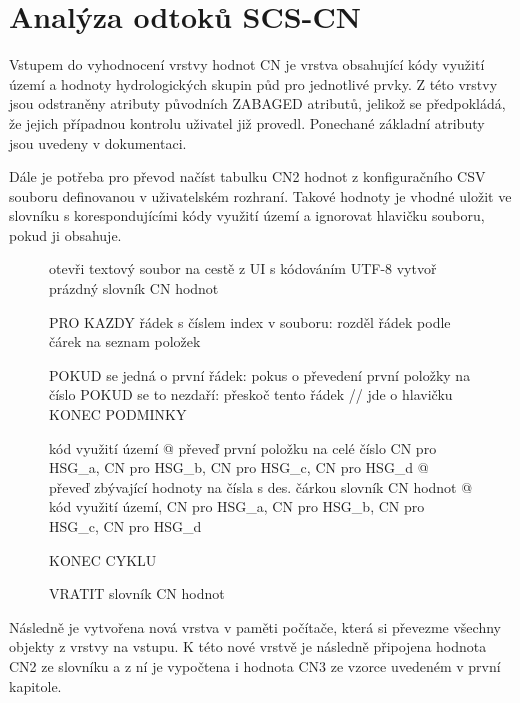 \documentclass[a4paper,oneside,12pt]{book}
\begin{document}
\section{Analýza odtoků SCS-CN} \label{CN}

\hspace{10mm}Vstupem do vyhodnocení vrstvy hodnot CN je vrstva obsahující kódy využití území a hodnoty hydrologických skupin půd pro jednotlivé prvky. Z této vrstvy jsou odstraněny atributy původních ZABAGED atributů, jelikož se předpokládá, že jejich případnou kontrolu uživatel již provedl. Ponechané základní atributy jsou uvedeny v dokumentaci.

\hspace{10mm} Dále je potřeba pro převod načíst tabulku CN2 hodnot z konfiguračního CSV souboru definovanou v uživatelském rozhraní. Takové hodnoty je vhodné uložit ve slovníku s korespondujícími kódy využití území a ignorovat hlavičku souboru, pokud ji obsahuje.  \newline

\begin{figure}[H]
\begin{pseudocode}[style=mypseudocode, caption={Vytvoření slovníku z CSV souboru},label={kod:cncsv}]
otevři textový soubor na cestě z UI s kódováním UTF-8
vytvoř prázdný slovník CN hodnot

PRO KAZDY řádek s číslem index v souboru:
    rozděl řádek podle čárek na seznam položek

    POKUD se jedná o první řádek:
        pokus o převedení první položky na číslo
        POKUD se to nezdaří:
            přeskoč tento řádek  // jde o hlavičku
    KONEC PODMINKY

    kód využití území @ převeď první položku na celé číslo 
    CN pro HSG_a, CN pro HSG_b, CN pro HSG_c, CN pro HSG_d @ převeď zbývající hodnoty na čísla s des. čárkou
    slovník CN hodnot @ kód využití území, CN pro HSG_a, CN pro HSG_b, CN pro HSG_c, CN pro HSG_d

KONEC CYKLU

VRATIT slovník CN hodnot
\end{pseudocode}
\end{figure}

\hspace{10mm}Následně je vytvořena nová vrstva v paměti počítače, která si převezme všechny objekty z vrstvy na vstupu. K této nové vrstvě je následně připojena hodnota CN2 ze slovníku a z ní je vypočtena i hodnota CN3 ze vzorce uvedeném v první kapitole.
\end{document}
